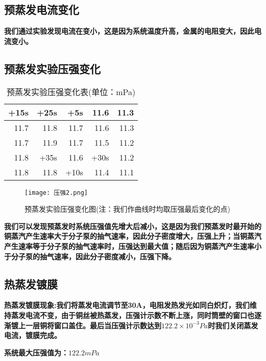 \documentclass[UTF8]{ctexart}
\begin{document}
\subsection{预蒸发电流变化}
\textbf{我们通过实验发现电流在变小，这是因为系统温度升高，金属的电阻变大，因此电流变小。}
\subsection{预蒸发实验压强变化}
\begin{table}[H]
	\centering
	\caption{预蒸发实验压强变化表(单位：mPa)}
	\begin{tabular}{|r|r|r|r|r|}
		\toprule[0.5mm]
		+15s & +25s & +5s    & 11.6  & 11.3 \\
		\hline
		11.7  & 11.8  & 11.7 & 11.6  & 11.3 \\
		\hline
		11.7  & 11.9  & 11.7 & 11.5  & 11.2 \\
		\hline
		11.8  & +35s & 11.6 & +30s & 11.2 \\
		\hline
		11.8  & 11.8  & +10s   & 11.4  & 11.1 \\
		\bottomrule[0.5mm]
	\end{tabular}
\end{table}
	\begin{figure}[H]
	\begin{center}
		\texttt{[image: 压强2.png]}
		\caption{预蒸发实验压强变化图(注：我们作曲线时均取压强最后变化的点)}
	\end{center}
\end{figure}
\par \textbf{我们可以发现预蒸发时系统压强值先增大后减小，这是因为我们预蒸发时最开始的铜蒸汽产生速率大于分子泵的抽气速率，因此分子密度增大，压强上升；当铜蒸汽产生速率等于分子泵的抽气速率时，压强达到最大值；随后因为铜蒸汽产生速率小于分子泵的抽气速率，因此分子密度减小，压强下降。}
\subsection{热蒸发镀膜}
\textbf{热蒸发镀膜现象:我们将蒸发电流调节至30A，电阻发热发光如同白炽灯，我们维持蒸发电流不变，由于铜丝被热蒸发，压强计示数不断上涨，同时筒壁的窗口也逐渐镀上一层铜将窗口盖住。最后当压强计示数达到$122.2\times 10^{-3}Pa$时我们关闭蒸发电流，镀膜完成。 }
\par \textbf{系统最大压强值为：$122.2mPa$}
\end{document}
